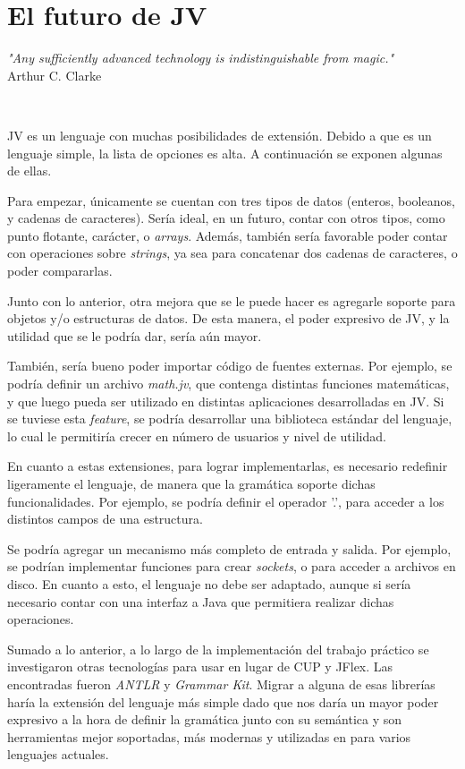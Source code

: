\documentclass{article}
\begin{document}
    \section{El futuro de JV}
        \begin{center}
            \par\textit{"Any sufficiently advanced technology is indistinguishable from magic."}\\Arthur C. Clarke\\
        \end{center}
        \\
        \par JV es un lenguaje con muchas posibilidades de extensión. Debido a que es un lenguaje simple, la lista de opciones es alta. A continuación se exponen algunas de ellas.
        \\
        \par Para empezar, únicamente se cuentan con tres tipos de datos (enteros, booleanos, y cadenas de caracteres). Sería ideal, en un futuro, contar con otros tipos, como punto flotante, carácter, o \textit{arrays}. Además, también sería favorable poder contar con operaciones sobre \textit{strings}, ya sea para concatenar dos cadenas de caracteres, o poder compararlas.
        \par Junto con lo anterior, otra mejora que se le puede hacer es agregarle soporte para objetos y/o estructuras de datos. De esta manera, el poder expresivo de JV, y la utilidad que se le podría dar, sería aún mayor.
        \par También, sería bueno poder importar código de fuentes externas. Por ejemplo, se podría definir un archivo \textit{math.jv}, que contenga distintas funciones matemáticas, y que luego pueda ser utilizado en distintas aplicaciones desarrolladas en JV. Si se tuviese esta \textit{feature}, se podría desarrollar una biblioteca estándar del lenguaje, lo cual le permitiría crecer en número de usuarios y nivel de utilidad.
        \par En cuanto a estas extensiones, para lograr implementarlas, es necesario redefinir ligeramente el lenguaje, de manera que la gramática soporte dichas funcionalidades. Por ejemplo, se podría definir el operador '.', para acceder a los distintos campos de una estructura.
        \par Se podría agregar un mecanismo más completo de entrada y salida. Por ejemplo, se podrían implementar funciones para crear \textit{sockets}, o para acceder a archivos en disco. En cuanto a esto, el lenguaje no debe ser adaptado, aunque si sería necesario contar con una interfaz a Java que permitiera realizar dichas operaciones.
            \par Sumado a lo anterior, a lo largo de la implementación del trabajo práctico se investigaron otras tecnologías para usar en lugar de CUP y JFlex. Las encontradas fueron \textit{ANTLR} y \textit{Grammar Kit}. Migrar a alguna de esas librerías haría la extensión del lenguaje más simple dado que nos daría un mayor poder expresivo a la hora de definir la gramática junto con su semántica y son herramientas mejor soportadas, más modernas y utilizadas en para varios lenguajes actuales.
    \clearpage
\end{document}
